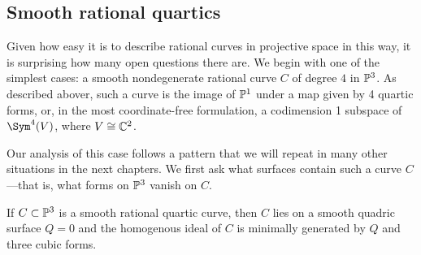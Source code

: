 \subsection *{Smooth rational quartics}
Given how easy it is to describe rational curves in projective space in this way, it is surprising how many open questions there are. We begin with
one of the simplest cases: a smooth nondegenerate rational curve $C$ of degree $4$ in $\PP^3$.
As described abover, such a curve is the image of $\PP^1$ under a map given by 4 quartic forms,
or, in the most coordinate-free formulation, a codimension 1 subspace of $\Sym^4(V)$, where
$V\cong \CC^2$.

Our analysis of this case follows a pattern that we will repeat in many other situations in the next
chapters. We first ask what surfaces contain such a curve $C$---that is, what forms on $\PP^3$ vanish on $C$. 

\begin{proposition}
If $C\subset \PP^3$ is a smooth rational quartic curve, then $C$ lies on a smooth quadric
surface $Q=0$ and the homogenous ideal of $C$ is minimally
generated by $Q$ and three cubic forms.
\end{proposition}


